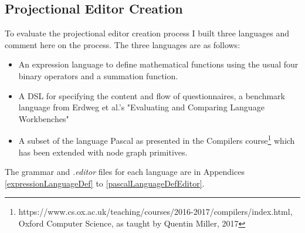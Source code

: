 \documentclass{article}
\begin{document}
{\subsection{Projectional Editor Creation}\label{creationEvaluation}
To evaluate the projectional editor creation process I built three languages and comment here on the process. The three languages are as follows:
\begin{itemize}
\item An expression language to define mathematical functions using the usual four binary operators and a summation function.
\item A DSL for specifying the content and flow of questionnaires, a benchmark language from Erdweg et al.'s "Evaluating and Comparing Language Workbenches"~\cite{languageWorkbenchChallenge}
\item A subset of the language Pascal as presented in the Compilers course\footnote{https://www.cs.ox.ac.uk/teaching/courses/2016-2017/compilers/index.html, Oxford Computer Science, as taught by Quentin Miller, 2017} which has been extended with node graph primitives. 
\end{itemize}
The grammar and \emph{.editor} files for each language are in Appendices \ref{expressionLanguageDef} to \ref{pascalLanguageDefEditor}.
%
}
\end{document}
